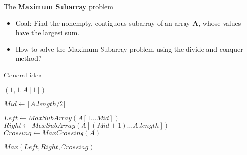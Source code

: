 \documentclass{beamer}
\begin{document}
\begin{frame}{The {\bf Maximum Subarray} problem}
  \begin{itemize}
    \item Goal: Find the nonempty, contiguous subarray of an
      array {\bf A}, whose values have the largest sum.
  \end{itemize} \pause
  

\end{frame}

\begin{frame}
  \begin{itemize}
    \item How to solve the Maximum Subarray problem using the {\color{blue}divide-and-conquer} method? \pause
  \end{itemize}


  \begin{block}{General idea}
    \begin{small}  
    \begin{algorithmic}
          $(1, 1, A[1])$  
       \EndIf

       \State
       
       \State $Mid \gets \lfloor A.length / 2 \rfloor$

       \State 
       \State $Left \gets MaxSubArray(A[1 \ldots Mid])$
       \State $Right \gets MaxSubArray(A[(Mid + 1) \ldots A.length])$
       \State $Crossing \gets MaxCrossing(A)$

       \State 
        $Max(Left, Right, Crossing)$
      \EndProcedure 
    \end{algorithmic}
  \end{small}  
  \end{block}

\end{frame}
\end{document}
